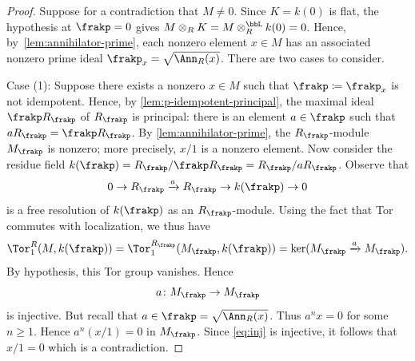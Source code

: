 \documentclass{amsart}
\numberwithin{equation}{section}%
\theoremstyle{remark}
\begin{document}
\begin{proof}
    Suppose for a contradiction that $M \neq 0$. Since $K = k(0)$ is flat, the hypothesis at $\frakp = 0$ gives $M \otimes_R K = M \otimes_R^{\bbL} k(0) = 0$. Hence, by~\cref{lem:annihilator-prime}, each nonzero element $x \in M$ has an associated nonzero prime ideal $\frakp_x = \sqrt{\Ann_R(x)}$. There are two cases to consider.

	\smallskip
	Case (1): Suppose there exists a nonzero $x \in M$ such that $\frakp\coloneqq\frakp_x$ is not idempotent. Hence, by \cref{lem:p-idempotent-principal}, the maximal ideal $\frakp R_{\frakp}$ of $R_{\frakp}$ is principal: there is an element $a \in \frakp$ such that $a R_{\frakp} = \frakp R_{\frakp}$. By \cref{lem:annihilator-prime}, the $R_{\frakp}$-module $M_{\frakp}$ is nonzero; more precisely, $x/1$ is a nonzero element. Now consider the residue field $k(\frakp) = R_{\frakp}/\frakp R_{\frakp} = R_{\frakp}/aR_{\frakp}$. Observe that 
	\[
		0 \to R_{\frakp} \xrightarrow{a} R_{\frakp} \to k(\frakp) \to 0
	\]
	is a free resolution of $k(\frakp)$ as an $R_{\frakp}$-module. Using the fact that Tor commutes with localization, we thus have
	\[
		\Tor_1^R(M,k(\frakp)) = \Tor_1^{R_{\frakp}}(M_{\frakp},k(\frakp)) = \ker(M_{\frakp} \xrightarrow{a} M_{\frakp}).
	\]
	By hypothesis, this Tor group vanishes. Hence
	\begin{equation}\label{eq:inj}
		a\colon M_{\frakp} \to M_{\frakp}
	\end{equation}
	is injective. But recall that $a \in \frakp = \sqrt{\Ann_R(x)}$. Thus $a^n x = 0$ for some $n \ge 1$. Hence $a^n (x/1) = 0$ in $M_{\frakp}$. Since \eqref{eq:inj} is injective, it follows that $x/1=0$ which is a contradiction.
  

\end{proof}
\end{document}
